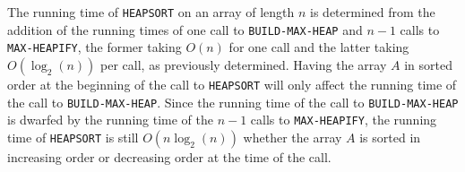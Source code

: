 The running time of \texttt{HEAPSORT} on an array of length $n$ is determined from the addition of the running times of one call to \texttt{BUILD-MAX-HEAP} and $n - 1$ calls to \texttt{MAX-HEAPIFY}, the former taking $O(n)$ for one call and the latter taking $O(\log_2(n))$ per call, as previously determined. Having the array $A$ in sorted order at the beginning of the call to \texttt{HEAPSORT} will only affect the running time of the call to \texttt{BUILD-MAX-HEAP}. Since the running time of the call to \texttt{BUILD-MAX-HEAP} is dwarfed by the running time of the $n - 1$ calls to \texttt{MAX-HEAPIFY}, the running time of \texttt{HEAPSORT} is still $O(n \log_2(n))$ whether the array $A$ is sorted in increasing order or decreasing order at the time of the call.
